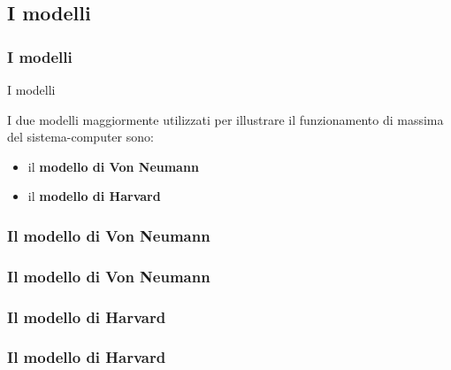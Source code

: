 \subsection[I modelli]{I modelli}
\begin{frame}
	\frametitle{I modelli}
	
	\begin{block}{I modelli}
		
		I due modelli maggiormente utilizzati per illustrare il funzionamento di massima del sistema-computer sono:
		\begin{itemize}
			\item il \textbf{modello di Von Neumann}
			\item il \textbf{modello di Harvard}
		\end{itemize}
	\end{block}
	
	
\end{frame}

\subsubsection[Il modello di Von Neumann]{Il modello di Von Neumann}
\begin{frame}
	\frametitle{Il modello di Von Neumann}
	
	\begin{block}{}
	
	\end{block}
	
	
\end{frame}


\subsubsection[Il modello di Harvard]{Il modello di Harvard}

\begin{frame}
	\frametitle{Il modello di Harvard}
	
	\begin{block}{}
	
	\end{block}
	
	
\end{frame}
